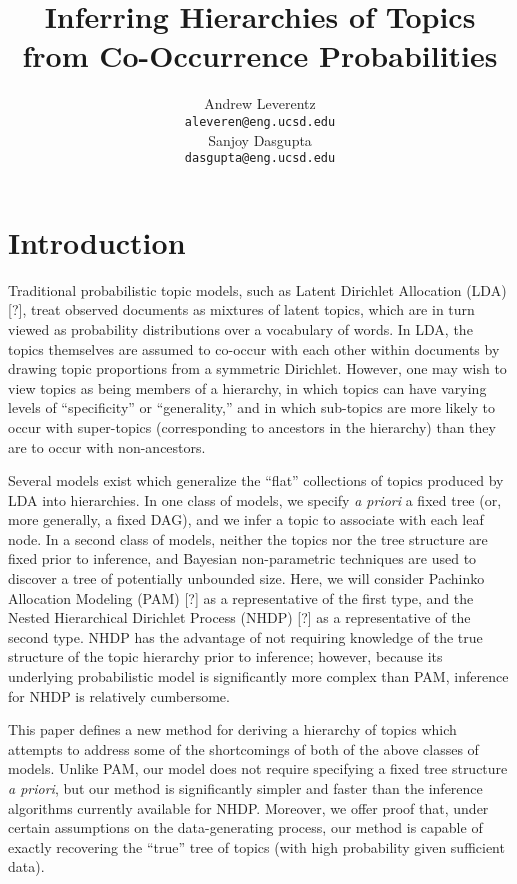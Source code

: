 \documentclass{article}
\title{Inferring Hierarchies of Topics from Co-Occurrence Probabilities}
\author{
  Andrew Leverentz \\
  \texttt{aleveren@eng.ucsd.edu} \\
  Sanjoy Dasgupta \\
  \texttt{dasgupta@eng.ucsd.edu}
}
\date{}
\theoremstyle{definition}
\newcommand{\TODOcite}{[?]}
\begin{document}
\maketitle


\section{Introduction}

Traditional probabilistic topic models, such as Latent Dirichlet Allocation (LDA) \TODOcite{}, treat observed documents as mixtures of latent topics, which are in turn viewed as probability distributions over a vocabulary of words.
In LDA, the topics themselves are assumed to co-occur with each other within documents by drawing topic proportions from a symmetric Dirichlet.
However, one may wish to view topics as being members of a hierarchy, in which topics can have varying levels of ``specificity'' or ``generality,'' and in which sub-topics are more likely to occur with super-topics (corresponding to ancestors in the hierarchy) than they are to occur with non-ancestors.

Several models exist which generalize the ``flat'' collections of topics produced by LDA into hierarchies.
In one class of models, we specify \emph{a priori} a fixed tree (or, more generally, a fixed DAG), and we infer a topic to associate with each leaf node.
In a second class of models, neither the topics nor the tree structure are fixed prior to inference, and Bayesian non-parametric techniques are used to discover a tree of potentially unbounded size.
Here, we will consider Pachinko Allocation Modeling (PAM) \TODOcite{} as a representative of the first type, and the Nested Hierarchical Dirichlet Process (NHDP) \TODOcite{} as a representative of the second type.
NHDP has the advantage of not requiring knowledge of the true structure of the topic hierarchy prior to inference;
however, because its underlying probabilistic model is significantly more complex than PAM, inference for NHDP is relatively cumbersome.

This paper defines a new method for deriving a hierarchy of topics which attempts to address some of the shortcomings of both of the above classes of models.
Unlike PAM, our model does not require specifying a fixed tree structure \emph{a priori}, but our method is significantly simpler and faster than the inference algorithms currently available for NHDP.
Moreover, we offer proof that, under certain assumptions on the data-generating process, our method is capable of exactly recovering the ``true'' tree of topics (with high probability given sufficient data).
\end{document}
